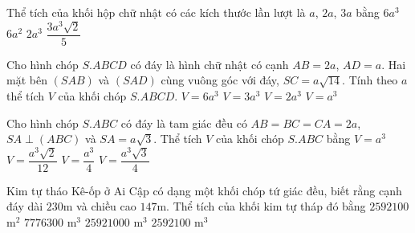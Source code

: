 	\begin{ex}%
		Thể tích của khối hộp chữ nhật có các kích thước lần lượt là $a$, $2a$, $3a$ bằng	
		\choice
		{\True $6a^3$}
		{$6a^2$}
		{$2a^3$}
		{$\dfrac{3a^3\sqrt{2}}{5}$}
	\end{ex}
	\begin{ex}%
		Cho hình chóp $S.ABCD$ có đáy là hình chữ nhật có cạnh $AB=2a$, $AD=a$. Hai mặt bên $(SAB)$ và $(SAD)$ cùng vuông góc với đáy, $SC=a\sqrt{14}$. Tính theo $a$ thể tích $V$ của khối chóp $S.ABCD$.
		\choice
		{$V=6a^3$}
		{$V=3a^3$}
		{\True $V=2a^3$}
		{$V=a^3$}
	\end{ex}
	\begin{ex}%
		Cho hình chóp $S.ABC$ có đáy là tam giác đều có $AB=BC=CA=2a$, $SA\perp(ABC)$ và $SA=a\sqrt{3}$. Thể tích $V$ của khối chóp $S.ABC$ bằng	
		\choice
		{\True $V=a^3$}
		{$V=\dfrac{a^3\sqrt{2}}{12}$}
		{$V=\dfrac{a^3}{4}$}
		{$V=\dfrac{a^3\sqrt{3}}{4}$}
	\end{ex}
	\begin{ex}%
		Kim tự tháo Kê-ốp ở Ai Cập có dạng một khối chóp tứ giác đều, biết rằng cạnh đáy dài $230$m và chiều cao $147$m. Thể tích của khối kim tự tháp đó bằng 
		\choice
		{$2592100$ m$^2$}
		{$7776300$ m$^3$}
		{$25921000$ m$^3$}
		{\True $2592100$ m$^3$}
	\end{ex}
